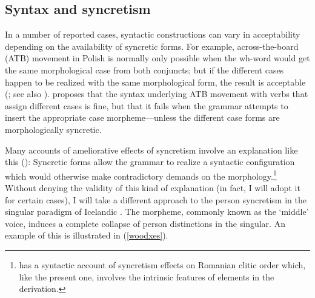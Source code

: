 \documentclass[output=paper,colorlinks,citecolor=brown,
]{langscibook}
\begin{document}
\subsection{Syntax and syncretism} 

In a number of reported cases, syntactic constructions can vary in acceptability depending on the availability of syncretic forms. For example, across-the-board (ATB)  movement in Polish is normally only possible when the wh-word would get the same morphological case from both conjuncts; but if the different cases happen to be realized with the same morphological form, the result is acceptable (\citealt{citko2005nature,hein2020case}; see also \citealt[fn2]{Ximenes:2007vs}). \cite{citko2005nature} proposes that the syntax underlying ATB movement with verbs that assign different cases is fine, but that it fails when the grammar attempts to insert the appropriate case morpheme---unless the different case forms are morphologically syncretic. 

Many accounts of ameliorative effects of syncretism involve an explanation like this (\citealt{pullum1986phonological,bejar1999multiple,Kratzer:2009jq,Ussery:2009jd,Bjorkman2016}): Syncretic forms allow the grammar to realize a syntactic configuration which would otherwise make contradictory demands on the morphology.\footnote{ \cite{Savescu:2009al} has a syntactic account of syncretism effects on Romanian clitic order which, like the present one,  involves the intrinsic features of elements in the derivation.}
 Without denying the validity of this kind of explanation (in fact, I will adopt it for certain cases), I will take a different approach to the person syncretism in the singular paradigm of Icelandic \stvsn. The \sti morpheme, commonly known as the `middle' voice, induces a complete collapse of person distinctions in the singular. An example of this is illustrated in (\ref{woodxes}). 
\end{document}
